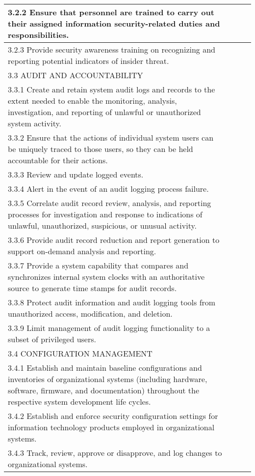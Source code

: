 \begin{longtable} {|p{}|p{}|p{}|p{} |}
{3.2.2 Ensure that personnel are trained to carry out their assigned information security-related duties and responsibilities.}&&& \\ \hline
{3.2.3 Provide security awareness training on recognizing and reporting potential indicators of insider threat.}&&& \\ \hline
{3.3 AUDIT AND ACCOUNTABILITY}&&& \\ \hline
{3.3.1 Create and retain system audit logs and records to the extent needed to enable the monitoring, analysis, investigation, and reporting of unlawful or unauthorized system activity.}&&& \\ \hline
{3.3.2 Ensure that the actions of individual system users can be uniquely traced to those users, so they can be held accountable for their actions.}&&& \\ \hline
{3.3.3 Review and update logged events.}&&& \\ \hline
{3.3.4 Alert in the event of an audit logging process failure.}&&& \\ \hline
{3.3.5 Correlate audit record review, analysis, and reporting processes for investigation and response to indications of unlawful, unauthorized, suspicious, or unusual activity.}&&& \\ \hline
{3.3.6 Provide audit record reduction and report generation to support on-demand analysis and reporting.}&&& \\ \hline
{3.3.7 Provide a system capability that compares and synchronizes internal system clocks with an authoritative source to generate time stamps for audit records.}&&& \\ \hline
{3.3.8 Protect audit information and audit logging tools from unauthorized access, modification, and deletion.}&&& \\ \hline
{3.3.9 Limit management of audit logging functionality to a subset of privileged users.}&&& \\ \hline
{3.4 CONFIGURATION MANAGEMENT}&&& \\ \hline
{3.4.1 Establish and maintain baseline configurations and inventories of organizational systems (including hardware, software, firmware, and documentation) throughout the respective system development life cycles.}&&& \\ \hline
{3.4.2 Establish and enforce security configuration settings for information technology products employed in organizational systems.}&&& \\ \hline
{3.4.3 Track, review, approve or disapprove, and log changes to organizational systems.}&&& \\ \hline

\end{longtable}
